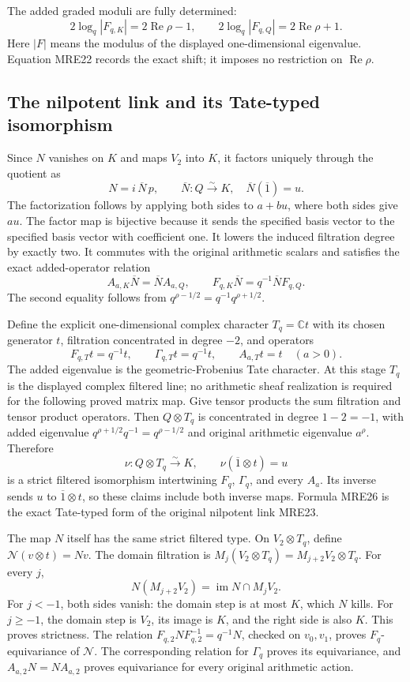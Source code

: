 The added graded moduli are fully determined:
\[
 2\log_q|F_{q,K}|=2\operatorname{Re}\rho-1,\qquad
 2\log_q|F_{q,Q}|=2\operatorname{Re}\rho+1.
 \tag{MRE22}
\]
Here \(|F|\) means the modulus of the displayed one-dimensional
eigenvalue. Equation MRE22 records the exact shift; it imposes no
restriction on \(\operatorname{Re}\rho\).

\subsection{The nilpotent link and its Tate-typed isomorphism}

Since \(N\) vanishes on \(K\) and maps \(V_2\) into \(K\), it factors
uniquely through the quotient as
\[
 N=i\,\overline N\,p,
 \qquad
 \overline N:Q\xrightarrow{\sim}K,
 \quad\overline N(\overline{1})=u.
 \tag{MRE23}
\]
The factorization follows by applying both sides to \(a+bu\), where
both sides give \(au\). The factor map is bijective because it sends
the specified basis vector to the specified basis vector with
coefficient one. It lowers the induced filtration degree by exactly two.
It commutes with the original arithmetic scalars and satisfies the exact
added-operator relation
\[
 A_{a,K}\overline N=\overline N A_{a,Q},\qquad
 F_{q,K}\overline N=q^{-1}\overline N F_{q,Q}.
 \tag{MRE24}
\]
The second equality follows from
\(q^{\rho-1/2}=q^{-1}q^{\rho+1/2}\).

Define the explicit one-dimensional complex character \(T_q=\mathbb C t\)
with its chosen generator \(t\), filtration concentrated in degree
\(-2\), and operators
\[
 F_{q,T}t=q^{-1}t,\qquad
 \Gamma_{q,T}t=q^{-1}t,\qquad
 A_{a,T}t=t\quad(a>0).
 \tag{MRE25}
\]
The added eigenvalue is the geometric-Frobenius Tate character. At this
stage \(T_q\) is the displayed complex filtered line; no arithmetic
sheaf realization is required for the following proved matrix map.
Give tensor products the sum filtration and tensor product operators.
Then \(Q\otimes T_q\) is concentrated in degree \(1-2=-1\), with added
eigenvalue \(q^{\rho+1/2}q^{-1}=q^{\rho-1/2}\) and original arithmetic
eigenvalue \(a^\rho\). Therefore
\[
 \nu:Q\otimes T_q\xrightarrow{\sim}K,
 \qquad \nu(\overline{1}\otimes t)=u
 \tag{MRE26}
\]
is a strict filtered isomorphism intertwining \(F_q\), \(\Gamma_q\), and
every \(A_a\). Its inverse sends \(u\) to \(\overline{1}\otimes t\),
so these claims include both inverse maps. Formula MRE26 is the exact
Tate-typed form of the original nilpotent link MRE23.

The map \(N\) itself has the same strict filtered type. On
\(V_2\otimes T_q\), define \(\mathcal N(v\otimes t)=Nv\).
The domain filtration is \(M_j(V_2\otimes T_q)=M_{j+2}V_2\otimes T_q\).
For every \(j\),
\[
 N(M_{j+2}V_2)=\operatorname{im}N\cap M_jV_2.
 \tag{MRE27}
\]
For \(j<-1\), both sides vanish: the domain step is at most \(K\),
which \(N\) kills. For \(j\geq-1\), the domain step is \(V_2\), its
image is \(K\), and the right side is also \(K\). This proves strictness.
The relation \(F_{q,2}NF_{q,2}^{-1}=q^{-1}N\), checked on \(v_0,v_1\),
proves \(F_q\)-equivariance of \(\mathcal N\). The corresponding relation
for \(\Gamma_q\) proves its equivariance, and \(A_{a,2}N=NA_{a,2}\)
proves equivariance for every original arithmetic action.

